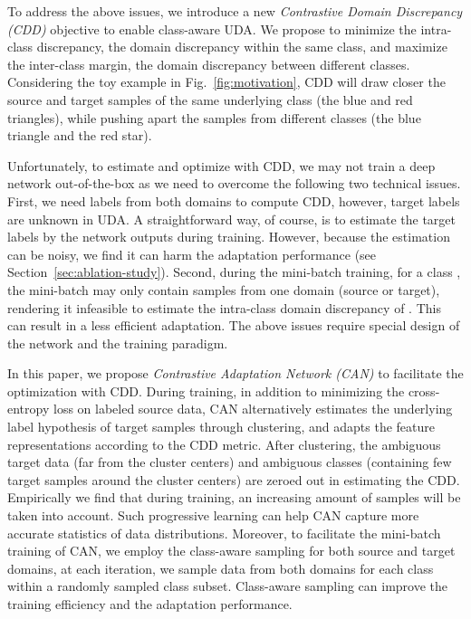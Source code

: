 \documentclass[10pt,twocolumn,letterpaper]{article}
\begin{document}
To address the above issues, we introduce a new \emph{Contrastive Domain Discrepancy (CDD)} objective to enable class-aware UDA. 
We propose to minimize the intra-class discrepancy, \ie the domain discrepancy within the same class, and maximize the inter-class margin, \ie the domain discrepancy between different classes.
Considering the toy example in Fig.~\ref{fig:motivation}, CDD will draw closer the source and target samples of the same underlying class (\eg the blue and red triangles), while 
pushing apart the samples from different classes (\eg the blue triangle and the red star).


Unfortunately, to estimate and optimize with CDD, we may not train a deep network out-of-the-box as we need to overcome the following two technical issues.
First, we need labels from both domains to compute CDD, however, target labels are unknown in UDA.
A straightforward way, of course, is to estimate the target labels by the network outputs during training.
However, because the estimation can be noisy, we find it can harm the adaptation performance (see Section~\ref{sec:ablation-study}).
Second, during the mini-batch training, 
for a class , the mini-batch may only contain samples from one domain (source or target), 
rendering it infeasible to estimate the intra-class domain discrepancy of . 
This can result in a less efficient adaptation.
The above issues require special design of the network and the training paradigm.

In this paper, we propose \emph{Contrastive Adaptation Network (CAN)} 
to facilitate the optimization with CDD. 
During training, in addition to minimizing the cross-entropy loss on labeled source data,
CAN alternatively estimates the underlying label hypothesis of target samples through clustering, 
and adapts the feature representations according to the CDD metric.
After clustering,
the ambiguous target data (\ie far from the cluster centers) 
and ambiguous classes (\ie containing few target samples around the cluster centers) 
are zeroed out in estimating the CDD.
Empirically we find that during training, 
an increasing amount of samples will be taken into account.
Such progressive learning can help CAN capture more accurate statistics of data distributions. Moreover, to facilitate the mini-batch training of CAN, 
we employ the class-aware sampling for both source and target domains,
\ie at each iteration, we sample data from both domains for each class within a randomly sampled class subset. Class-aware sampling can improve the training efficiency and the adaptation performance.
\end{document}
